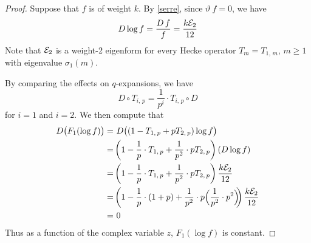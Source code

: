 \documentclass{gtpart}
\theoremstyle{definition}
\theoremstyle{remark}
\newcommand{\CE}{{\cal E}}
\newcommand{\si}{\sigma}
\renewcommand{\=}{\approx}
\renewcommand{\-}{\sim}
\numberwithin{equation}{section}
\begin{document}
\begin{proof}
 Suppose that $f$ is of weight $k$.  By \eqref{serre}, since 
 $\vartheta ~\! f = 0$, we have 
 \[
  D \log f = \frac{D ~\! f}{f} = \frac{k \CE_2}{12} 
 \]
 Note that $\CE_2$ is a weight-2 eigenform for every Hecke operator 
 $T_m = T_{1,\,m}$, $m \geq 1$ with eigenvalue $\si_1(m)$.  

 By comparing the effects on $q$-expansions, we have 
 \begin{equation}
  \label{DT}
  D \circ T_{i,\,p} = \frac{1}{p^i} \cdot T_{i,\,p} \circ D 
 \end{equation}
 for $i = 1$ and $i = 2$.  We then compute that 
 \begin{equation*}
  \begin{split}
   D \big( F_1(\log f) \big) = & ~ D \big( (1 - T_{1,\,p} + p T_{2,\,p}) 
                                 \log f \big) \\
                             = & \left( 1 - \frac{1}{p} \cdot T_{1,\,p} + 
                                 \frac{1}{p^2} \cdot p T_{2,\,p} \right) 
                                 (D \log f) \\
                             = & \left( 1 - \frac{1}{p} \cdot T_{1,\,p} + 
                                 \frac{1}{p^2} \cdot p T_{2,\,p} \right) 
                                 \frac{k \CE_2}{12} \\
                             = & \left( 1 - \frac{1}{p} \cdot (1 + p) + 
                                 \frac{1}{p^2} \cdot p \Big( \frac{1}{p^2} \cdot 
                                 p^2 \Big) \!\! \right) \frac{k \CE_2}{12} \\
                             = & ~ 0 
  \end{split}
 \end{equation*}
 Thus as a function of the complex variable $z$, $F_1(\log f)$ is constant.  
\end{proof}
\end{document}
